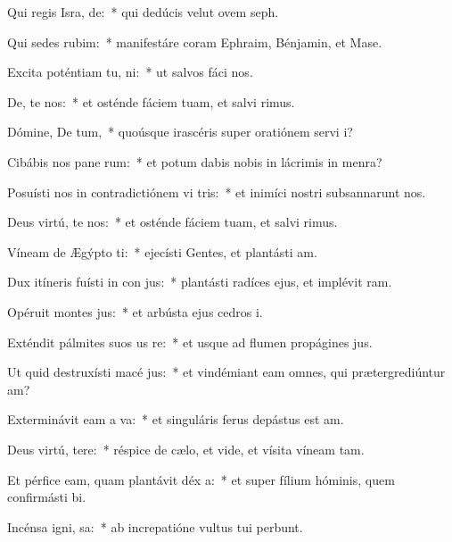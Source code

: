 \item Qui regis Isra, de:~* qui dedúcis velut ovem seph.
\item Qui sedes  rubim:~* manifestáre coram Ephraim, Bénjamin, et Mase.
\item Excita poténtiam tu,  ni:~* ut salvos fáci nos.
\item De, te nos:~* et osténde fáciem tuam, et salvi rimus.
\item Dómine, De tum,~* quoúsque irascéris super oratiónem servi i?
\item Cibábis nos pane rum:~* et potum dabis nobis in lácrimis in menra?
\item Posuísti nos in contradictiónem vi tris:~* et inimíci nostri subsannarunt nos.
\item Deus virtú, te nos:~* et osténde fáciem tuam, et salvi rimus.
\item Víneam de Ægýpto ti:~* ejecísti Gentes, et plantásti am.
\item Dux itíneris fuísti in con jus:~* plantásti radíces ejus, et implévit ram.
\item Opéruit montes  jus:~* et arbústa ejus cedros i.
\item Exténdit pálmites suos us  re:~* et usque ad flumen propágines jus.
\item Ut quid destruxísti macé jus:~* et vindémiant eam omnes, qui prætergrediúntur am?
\item Exterminávit eam a  va:~* et singuláris ferus depástus est am.
\item Deus virtú, tere:~* réspice de cælo, et vide, et vísita víneam tam.
\item Et pérfice eam, quam plantávit déx a:~* et super fílium hóminis, quem confirmásti bi.
\item Incénsa igni,  sa:~* ab increpatióne vultus tui perbunt.
